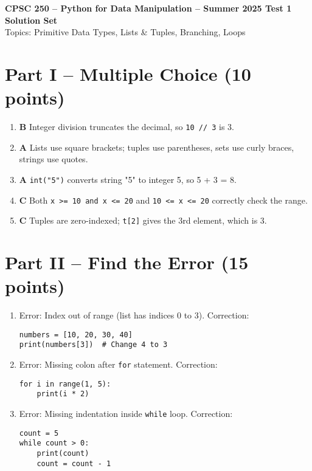\documentclass[12pt]{article}
\begin{document}
\begin{center}
    \Large \textbf{CPSC 250 – Python for Data Manipulation – Summer 2025 Test 1} \\
    \large \textbf{Solution Set} \\
    \normalsize Topics: Primitive Data Types, Lists \& Tuples, Branching, Loops
\end{center}

\vspace{0.5cm}

\section*{Part I – Multiple Choice (10 points)}

\begin{enumerate}[label=\arabic*.]
    \item \textbf{B} \quad Integer division truncates the decimal, so \texttt{10 // 3} is 3.

    \item \textbf{A} \quad Lists use square brackets; tuples use parentheses, sets use curly braces, strings use quotes.

    \item \textbf{A} \quad \texttt{int("5")} converts string "5" to integer 5, so 5 + 3 = 8.

    \item \textbf{C} \quad Both \texttt{x >= 10 and x <= 20} and \texttt{10 <= x <= 20} correctly check the range.

    \item \textbf{C} \quad Tuples are zero-indexed; \texttt{t[2]} gives the 3rd element, which is 3.
\end{enumerate}

\section*{Part II – Find the Error (15 points)}

\begin{enumerate}[resume,label=\arabic*.]
    \item Error: Index out of range (list has indices 0 to 3). Correction:
\begin{lstlisting}
numbers = [10, 20, 30, 40]
print(numbers[3])  # Change 4 to 3
\end{lstlisting}

    \item Error: Missing colon after \texttt{for} statement. Correction:
\begin{lstlisting}
for i in range(1, 5):
    print(i * 2)
\end{lstlisting}

    \item Error: Missing indentation inside \texttt{while} loop. Correction:
\begin{lstlisting}
count = 5
while count > 0:
    print(count)
    count = count - 1
\end{lstlisting}
\end{enumerate}
\end{document}
